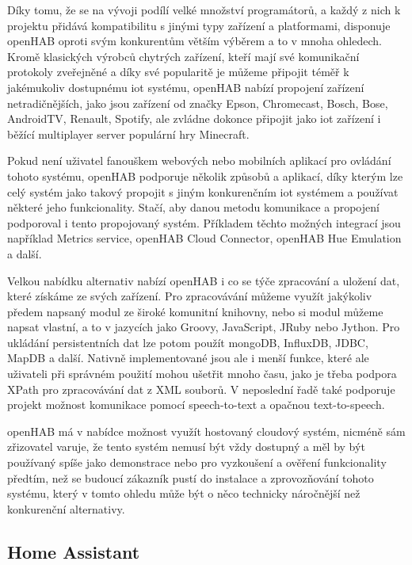 Díky tomu, že se na vývoji podílí velké množství programátorů, a každý z nich k projektu přidává kompatibilitu s jinými typy zařízení a platformami, disponuje openHAB oproti svým konkurentům větším výběrem a to v mnoha ohledech. Kromě klasických výrobců chytrých zařízení, kteří mají své komunikační protokoly zveřejněné a díky své popularitě je můžeme připojit téměř k jakémukoliv dostupnému \acrshort{iot} systému, openHAB nabízí propojení zařízení netradičnějších, jako jsou zařízení od značky Epson, Chromecast, Bosch, Bose, AndroidTV, Renault, Spotify, ale zvládne dokonce připojit jako \acrshort{iot} zařízení i běžící multiplayer server populární hry Minecraft.

Pokud není uživatel fanouškem webových nebo mobilních aplikací pro ovládání tohoto systému, openHAB podporuje několik způsobů a aplikací, díky kterým lze celý systém jako takový propojit s jiným konkurenčním \acrshort{iot} systémem a používat některé jeho funkcionality. Stačí, aby danou metodu komunikace a propojení podporoval i tento propojovaný systém. Příkladem těchto možných integrací jsou například Metrics service, openHAB Cloud Connector, openHAB Hue Emulation a další.

Velkou nabídku alternativ nabízí openHAB i co se týče zpracování a uložení dat, které získáme ze svých zařízení. Pro zpracovávání můžeme využít jakýkoliv předem napsaný modul ze široké komunitní knihovny, nebo si modul můžeme napsat vlastní, a to v jazycích jako Groovy, JavaScript, JRuby nebo Jython. Pro ukládání persistentních dat lze potom použít mongoDB, InfluxDB, JDBC, MapDB a další. Nativně implementované jsou ale i menší funkce, které ale uživateli při správném použití mohou ušetřit mnoho času, jako je třeba podpora XPath pro zpracovávání dat z XML souborů. V neposlední řadě také podporuje projekt možnost komunikace pomocí speech-to-text a opačnou text-to-speech.

openHAB má v nabídce možnost využít hostovaný cloudový systém, nicméně sám zřizovatel varuje, že tento systém nemusí být vždy dostupný a měl by být používaný spíše jako demonstrace nebo pro vyzkoušení a ověření funkcionality předtím, než se budoucí zákazník pustí do instalace a zprovozňování tohoto systému, který v tomto ohledu může být o něco technicky náročnější než konkurenční alternativy.

\subsection{Home Assistant}

